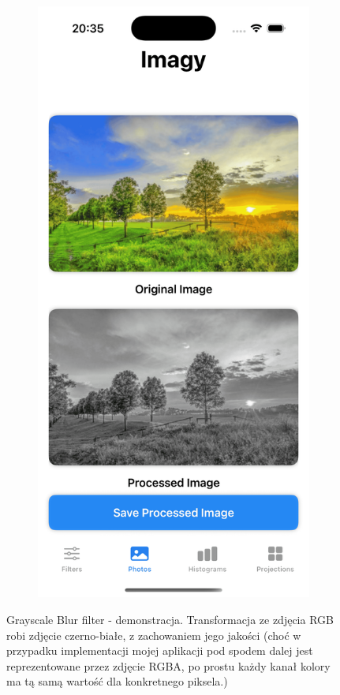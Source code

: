 \documentclass[a4paper]{article}
\begin{document}
\begin{figure}[H]
\begin{subfigure}{0.2\textwidth}
        \label{fig:dog_gray}
    \end{subfigure}
    \begin{subfigure}{0.2\textwidth}
        \centering
        \includegraphics[width=\linewidth]{images/trees_gray.png}
        \label{fig:trees_gray}
    \end{subfigure}
    \caption{Grayscale Blur filter - demonstracja. Transformacja ze zdjęcia RGB robi zdjęcie czerno-białe, z zachowaniem jego jakości (choć w przypadku implementacji mojej aplikacji pod spodem dalej jest reprezentowane przez zdjęcie RGBA, po prostu każdy kanał kolory ma tą samą wartość dla konkretnego piksela.)}
    \label{fig:glitch}
\end{figure}
\end{document}

